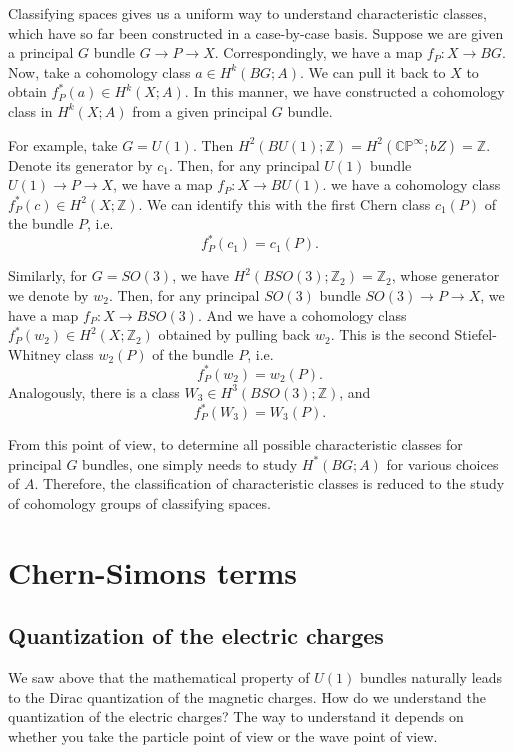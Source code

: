 \documentclass[12pt]{article}
\numberwithin{equation}{section}
\numberwithin{figure}{section}
\theoremstyle{remark}
\def\bZ{\mathbb{Z}}
\def\CP{\mathbb{CP}}
\begin{document}
Classifying spaces gives us a uniform way to understand characteristic classes,
which have so far been constructed in a case-by-case basis.
Suppose we are given a principal $G$ bundle $G\to P\to X$.
Correspondingly, we have a map $f_P:X\to BG$.
Now, take a cohomology class $a\in H^k(BG;A)$.
We can pull it back to $X$ to obtain $f_P^*(a)\in H^k(X;A)$.
In this manner, we have constructed a cohomology class in $H^k(X;A)$
from a given principal $G$ bundle.

For example, take $G=U(1)$.
Then $H^2(BU(1);\bZ)=H^2(\CP^\infty;bZ)=\bZ$.
Denote its generator by $c_1$.
Then, for any principal $U(1)$ bundle $U(1)\to P\to X$,
we have a map $f_P:X\to BU(1)$.
we have a cohomology class $f_P^*(c)\in H^2(X;\bZ)$.
We can identify this with the first Chern class $c_1(P)$ of the bundle $P$,
i.e.~\begin{equation}
f_P^*(c_1)=c_1(P).
\end{equation}

Similarly, for $G=SO(3)$, we have $H^2(BSO(3);\bZ_2)=\bZ_2$,
whose generator we denote by $w_2$.
Then, for any principal $SO(3)$ bundle $SO(3)\to P\to X$,
we have a map $f_P:X\to BSO(3)$.
And we have a cohomology class $f_P^*(w_2)\in H^2(X;\bZ_2)$
obtained by pulling back $w_2$.
This is the second Stiefel-Whitney class $w_2(P)$ of the bundle $P$,
i.e.~\begin{equation}
f_P^*(w_2)=w_2(P).
\end{equation}
Analogously, there is a class $W_3\in H^3(BSO(3);\bZ)$,
and \begin{equation}
f_P^*(W_3)=W_3(P).
\end{equation}

From this point of view, to determine all possible characteristic classes
for principal $G$ bundles,
one simply needs to study $H^*(BG;A)$ for various choices of $A$.
Therefore, the classification of characteristic classes
is reduced to the study of cohomology groups of classifying spaces.

\section{Chern-Simons terms}

\subsection{Quantization of the electric charges}
We saw above that the mathematical property of $U(1)$ bundles naturally leads to the Dirac quantization of the magnetic charges.
How do we understand the quantization of the electric charges? 
The way to understand it depends on whether you take the particle point of view or the wave point of view.
\end{document}
